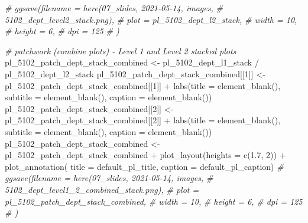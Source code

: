 \documentclass[
]{article}
\newenvironment{Shaded}{\begin{snugshade}}{\end{snugshade}}
\newcommand{\AttributeTok}[1]{\textcolor[rgb]{0.77,0.63,0.00}{#1}}
\newcommand{\CommentTok}[1]{\textcolor[rgb]{0.56,0.35,0.01}{\textit{#1}}}
\newcommand{\DecValTok}[1]{\textcolor[rgb]{0.00,0.00,0.81}{#1}}
\newcommand{\FloatTok}[1]{\textcolor[rgb]{0.00,0.00,0.81}{#1}}
\newcommand{\FunctionTok}[1]{\textcolor[rgb]{0.00,0.00,0.00}{#1}}
\newcommand{\NormalTok}[1]{#1}
\newcommand{\OtherTok}[1]{\textcolor[rgb]{0.56,0.35,0.01}{#1}}
\newcommand{\SpecialCharTok}[1]{\textcolor[rgb]{0.00,0.00,0.00}{#1}}
\begin{document}
\begin{Shaded}
\begin{Highlighting}[]
\CommentTok{\# ggsave(filename = here(\textquotesingle{}07\_slides\textquotesingle{}, \textquotesingle{}2021{-}05{-}14\textquotesingle{}, \textquotesingle{}images\textquotesingle{}, }
\CommentTok{\#                        \textquotesingle{}5102\_dept\_level2\_stack.png\textquotesingle{}), }
\CommentTok{\#        plot = pl\_5102\_dept\_l2\_stack, }
\CommentTok{\#        width = 10, }
\CommentTok{\#        height = 6, }
\CommentTok{\#        dpi = 125}
\CommentTok{\#        )}

\CommentTok{\# patchwork (combine plots) {-} Level 1 and Level 2 stacked plots}
\NormalTok{pl\_5102\_patch\_dept\_stack\_combined }\OtherTok{\textless{}{-}}\NormalTok{ pl\_5102\_dept\_l1\_stack }\SpecialCharTok{/}\NormalTok{ pl\_5102\_dept\_l2\_stack}
\NormalTok{pl\_5102\_patch\_dept\_stack\_combined[[}\DecValTok{1}\NormalTok{]] }\OtherTok{\textless{}{-}}\NormalTok{ pl\_5102\_patch\_dept\_stack\_combined[[}\DecValTok{1}\NormalTok{]] }\SpecialCharTok{+} 
    \FunctionTok{labs}\NormalTok{(}\AttributeTok{title =} \FunctionTok{element\_blank}\NormalTok{(),}
         \AttributeTok{subtitle =} \FunctionTok{element\_blank}\NormalTok{(),}
         \AttributeTok{caption =} \FunctionTok{element\_blank}\NormalTok{())}
\NormalTok{pl\_5102\_patch\_dept\_stack\_combined[[}\DecValTok{2}\NormalTok{]] }\OtherTok{\textless{}{-}}\NormalTok{ pl\_5102\_patch\_dept\_stack\_combined[[}\DecValTok{2}\NormalTok{]] }\SpecialCharTok{+} 
    \FunctionTok{labs}\NormalTok{(}\AttributeTok{title =} \FunctionTok{element\_blank}\NormalTok{(),}
         \AttributeTok{subtitle =} \FunctionTok{element\_blank}\NormalTok{(),}
         \AttributeTok{caption =} \FunctionTok{element\_blank}\NormalTok{())}
\NormalTok{pl\_5102\_patch\_dept\_stack\_combined }\OtherTok{\textless{}{-}}\NormalTok{ pl\_5102\_patch\_dept\_stack\_combined }\SpecialCharTok{+} 
    \FunctionTok{plot\_layout}\NormalTok{(}\AttributeTok{heights =} \FunctionTok{c}\NormalTok{(}\FloatTok{1.7}\NormalTok{, }\DecValTok{2}\NormalTok{)) }\SpecialCharTok{+}
    \FunctionTok{plot\_annotation}\NormalTok{(}
        \AttributeTok{title =}\NormalTok{ default\_pl\_title,}
        \AttributeTok{caption =}\NormalTok{ default\_pl\_caption)}
\CommentTok{\# ggsave(filename = here(\textquotesingle{}07\_slides\textquotesingle{}, \textquotesingle{}2021{-}05{-}14\textquotesingle{}, \textquotesingle{}images\textquotesingle{}, }
\CommentTok{\#                        \textquotesingle{}5102\_dept\_level1\_2\_combined\_stack.png\textquotesingle{}), }
\CommentTok{\#        plot = pl\_5102\_patch\_dept\_stack\_combined, }
\CommentTok{\#        width = 10, }
\CommentTok{\#        height = 6, }
\CommentTok{\#        dpi = 125}
\CommentTok{\#        )}


\end{Highlighting}
\end{Shaded}
\end{document}
